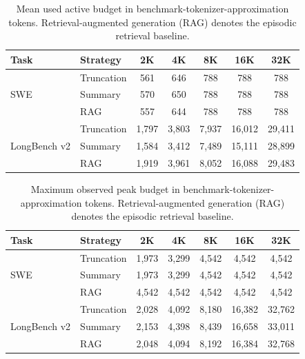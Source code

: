 \begin{table}[p]
\centering
\caption{Mean used active budget in benchmark-tokenizer-approximation tokens. Retrieval-augmented generation (RAG) denotes the episodic retrieval baseline.}
\label{tab:app_mean_used}
\begin{tabular}{llccccc}
\toprule
Task & Strategy & 2K & 4K & 8K & 16K & 32K \\
\midrule
\multirow{3}{*}{SWE} & Truncation & 561 & 646 & 788 & 788 & 788 \\
& Summary & 570 & 650 & 788 & 788 & 788 \\
& RAG & 557 & 644 & 788 & 788 & 788 \\
\midrule
\multirow{3}{*}{LongBench v2} & Truncation & 1,797 & 3,803 & 7,937 & 16,012 & 29,411 \\
& Summary & 1,584 & 3,412 & 7,489 & 15,111 & 28,899 \\
& RAG & 1,919 & 3,961 & 8,052 & 16,088 & 29,483 \\
\bottomrule
\end{tabular}
\end{table}

\begin{table}[p]
\centering
\caption{Maximum observed peak budget in benchmark-tokenizer-approximation tokens. Retrieval-augmented generation (RAG) denotes the episodic retrieval baseline.}
\label{tab:app_peak}
\begin{tabular}{llccccc}
\toprule
Task & Strategy & 2K & 4K & 8K & 16K & 32K \\
\midrule
\multirow{3}{*}{SWE} & Truncation & 1,973 & 3,299 & 4,542 & 4,542 & 4,542 \\
& Summary & 1,973 & 3,299 & 4,542 & 4,542 & 4,542 \\
& RAG & 4,542 & 4,542 & 4,542 & 4,542 & 4,542 \\
\midrule
\multirow{3}{*}{LongBench v2} & Truncation & 2,028 & 4,092 & 8,180 & 16,382 & 32,762 \\
& Summary & 2,153 & 4,398 & 8,439 & 16,658 & 33,011 \\
& RAG & 2,048 & 4,094 & 8,192 & 16,384 & 32,768 \\
\bottomrule
\end{tabular}
\end{table}

